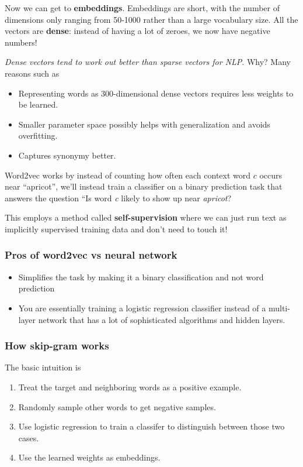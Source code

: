 \documentclass[11pt]{article}
\begin{document}
Now we can get to \textbf{embeddings}. Embeddings are short, with the number of
dimensions only ranging from 50-1000 rather than a large vocabulary size. All
the vectors are \textbf{dense}: instead of having a lot of zeroes, we now have
negative numbers!

\textit{Dense vectors tend to work out better than sparse vectors for NLP}. Why?
Many reasons such as

\begin{itemize}

	\item Representing words as 300-dimensional dense vectors requires less
	      weights to be learned.
	\item Smaller parameter space possibly helps with generalization and avoids
	      overfitting.
	\item Captures synonymy better.

\end{itemize}


Word2vec works by instead of counting how often each context word $c$ occurs
near ``apricot'', we'll instead train a classifier on a binary prediction task
that answers the question ``Is word \textit{c} likely to show up near
\textit{apricot}?

This employs a method called \textbf{self-supervision} where we can just run
text as implicitly supervised training data and don't need to touch it!

\subsubsection{Pros of word2vec vs neural network}

\begin{itemize}
	\item Simplifies the task by making it a binary classification and not word
	      prediction
	\item You are essentially training a logistic regression classifier instead of
	      a multi-layer network that has a lot of sophisticated algorithms and
	      hidden layers.
\end{itemize}

\subsubsection{How skip-gram works}

The basic intuition is


\begin{enumerate}
	\item Treat the target and neighboring words as a positive example.
	\item Randomly sample other words to get negative samples.
	\item Use logistic regression to train a classifer to distinguish between those two cases.
	\item Use the learned weights as embeddings.
\end{enumerate}
\end{document}
